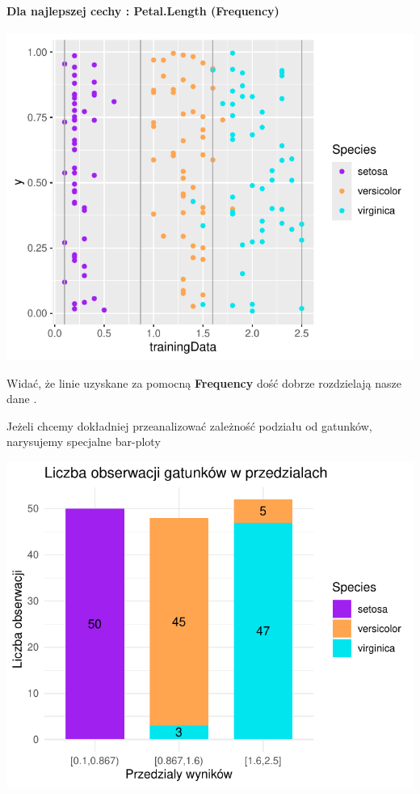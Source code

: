 \documentclass[
  12pt,
]{article}
\begin{document}
\paragraph{Dla najlepszej cechy : Petal.Length
(Frequency)}\label{dla-najlepszej-cechy-petal.length-frequency}

\begin{center}\includegraphics{Sprawozdanie2_files/figure-latex/frequences_najl-1} \end{center}

Widać, że linie uzyskane za pomocną \textbf{Frequency} dość dobrze
rozdzielają nasze dane .

Jeżeli chcemy dokładniej przeanalizować zależność podziału od gatunków,
narysujemy specjalne bar-ploty

\begin{center}\includegraphics{Sprawozdanie2_files/figure-latex/tabela_kondygnacji_1_najl-1} \end{center}
\end{document}
